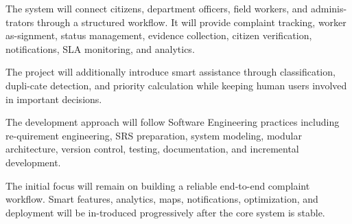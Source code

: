 \documentclass[12pt,a4paper]{article}
\begin{document}
The system will connect citizens, department officers, field workers, and adminis-trators through a structured workflow. It will provide complaint tracking, worker as-signment, status management, evidence collection, citizen verification, notifications, SLA monitoring, and analytics.

The project will additionally introduce smart assistance through classification, dupli-cate detection, and priority calculation while keeping human users involved in important decisions.

The development approach will follow Software Engineering practices including re-quirement engineering, SRS preparation, system modeling, modular architecture, version control, testing, documentation, and incremental development.

The initial focus will remain on building a reliable end-to-end complaint workflow. Smart features, analytics, maps, notifications, optimization, and deployment will be in-troduced progressively after the core system is stable.
\end{document}
